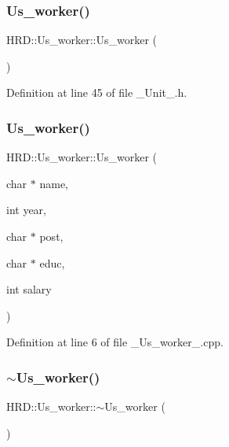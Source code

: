 \subsubsection{Us\+\_\+worker()\hspace{0.1cm}{\footnotesize\ttfamily [1/2]}}
{\footnotesize\ttfamily H\+R\+D\+::\+Us\+\_\+worker\+::\+Us\+\_\+worker (\begin{DoxyParamCaption}{ }\end{DoxyParamCaption})\hspace{0.3cm}{\ttfamily [inline]}}



Definition at line 45 of file \+\_\+\+Unit\+\_\+.\+h.

\mbox{\label{class_h_r_d_1_1_us__worker_ac0a6cff72a4b5f7f4f26e5a336f25c91}} 
\subsubsection{Us\+\_\+worker()\hspace{0.1cm}{\footnotesize\ttfamily [2/2]}}
{\footnotesize\ttfamily H\+R\+D\+::\+Us\+\_\+worker\+::\+Us\+\_\+worker (\begin{DoxyParamCaption}\item[{char $\ast$}]{name,  }\item[{int}]{year,  }\item[{char $\ast$}]{post,  }\item[{char $\ast$}]{educ,  }\item[{int}]{salary }\end{DoxyParamCaption})}



Definition at line 6 of file \+\_\+\+Us\+\_\+worker\+\_\+.\+cpp.

\mbox{\label{class_h_r_d_1_1_us__worker_ae14459b2b134dc0561abca6132027ccd}} 
\subsubsection{$\sim$\+Us\+\_\+worker()}
{\footnotesize\ttfamily H\+R\+D\+::\+Us\+\_\+worker\+::$\sim$\+Us\+\_\+worker (\begin{DoxyParamCaption}{ }\end{DoxyParamCaption})}



